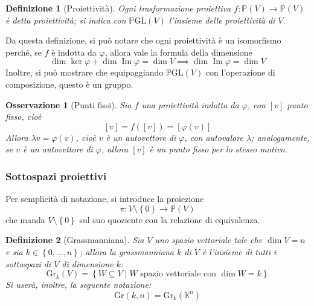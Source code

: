 \documentclass[12pt]{scrartcl}
\theoremstyle{style}
\newtheorem{definizione}{Definizione}[section]
\newtheorem{osservazione}{Osservazione}[section]
\numberwithin{equation}{subsection}
\begin{document}
\begin{definizione}
[Proiettivit\`a]
Ogni trasformazione proiettiva $f:\mathbb{P}(V) \to \mathbb{P}(V)$ \`e detta \textit{proiettivit\`a}; si indica con $\mathbb{P}\mathrm{GL} (V)$ l'insieme delle proiettivit\`a di $V$.
\end{definizione}
\noindent Da questa definizione, si pu\`o notare che ogni proiettivit\`a \`e un isomorfismo perch\'e, se $f$ \`e indotta da $\varphi $, allora vale la formula della dimensione 
\[
	\dim \ker \varphi + \dim \operatorname{Im} \varphi = \dim V \implies \dim \operatorname{Im} \varphi  = \dim V
\] 
Inoltre, si pu\`o mostrare che equipaggiando $\mathbb{P}\mathrm{GL} (V)$ con l'operazione di composizione, questo \`e un gruppo.
\begin{osservazione}
	[Punti fissi]
	Sia $f$ una proiettivit\`a indotta da $\varphi $, con $[v]$ punto fisso, cio\`e
	\[
		[v]  = f([v]) = [\varphi (v)]
	\] 
	Allora $\lambda v = \varphi (v)$, cio\`e $v$ \`e un autovettore di $\varphi $, con autovalore $\lambda $; analogamente, se $v$ \`e un autovettore di $\varphi $, allora $[v]$ \`e un punto fisso per lo stesso motivo.
\end{osservazione}
\subsubsection{Sottospazi proiettivi}
Per semplicit\`a di notazione, si introduce la proiezione
\begin{equation}
	\pi : V \setminus \left\{ 0 \right\} \to \mathbb{P}(V)
\end{equation}
che manda $V \setminus \left\{ 0 \right\} $ sul suo quoziente con la relazione di equivalenza.
\begin{definizione}
	[Grassmanniana]
	Sia $V$ uno spazio vettoriale tale che $\dim V = n$ e sia $k \in \left\{ 0,\ldots,n \right\}$; allora la \textit{grassmanniana} $k$ di $V$ \`e l'insieme di tutti i sottospazi di $V$ di dimensione $k$:
	\[
	\mathrm{Gr} _k (V) = \left\{ W \subseteq V  \mid W \text{ spazio vettoriale con } \dim W = k \right\} 
	\] 
Si user\`a, inoltre, la seguente notazione:
\[
\mathrm{Gr}  (k,n) = \mathrm{Gr}  _{k} (\mathbb{K}^{n} )
\] 
\end{definizione}
\end{document}
